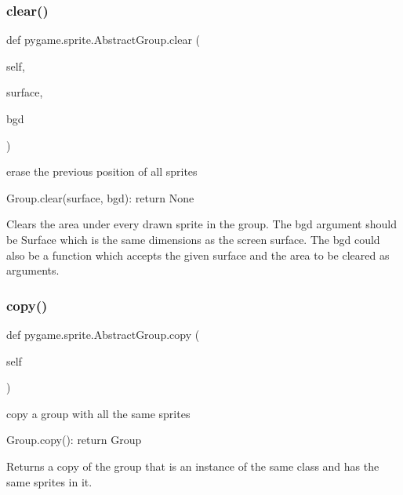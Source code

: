 \subsubsection{\texorpdfstring{clear()}{clear()}}
{\footnotesize\ttfamily def pygame.\+sprite.\+Abstract\+Group.\+clear (\begin{DoxyParamCaption}\item[{}]{self,  }\item[{}]{surface,  }\item[{}]{bgd }\end{DoxyParamCaption})}

\begin{DoxyVerb}erase the previous position of all sprites

Group.clear(surface, bgd): return None

Clears the area under every drawn sprite in the group. The bgd
argument should be Surface which is the same dimensions as the
screen surface. The bgd could also be a function which accepts
the given surface and the area to be cleared as arguments.\end{DoxyVerb}
 \mbox{\label{classpygame_1_1sprite_1_1_abstract_group_aebd4e64280d4f480ed46d673e22dd57f}} 
\subsubsection{\texorpdfstring{copy()}{copy()}}
{\footnotesize\ttfamily def pygame.\+sprite.\+Abstract\+Group.\+copy (\begin{DoxyParamCaption}\item[{}]{self }\end{DoxyParamCaption})}

\begin{DoxyVerb}copy a group with all the same sprites

Group.copy(): return Group

Returns a copy of the group that is an instance of the same class
and has the same sprites in it.\end{DoxyVerb}
 \mbox{\label{classpygame_1_1sprite_1_1_abstract_group_a67c4d4f27e68ab337d9d475a515add96}} 
